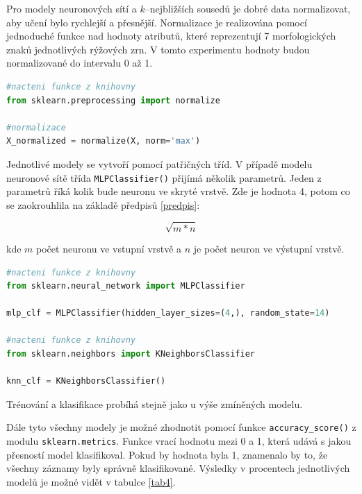Pro modely neuronových sítí a $k$--nejbližších sousedů je dobré data normalizovat, aby učení bylo rychlejší a přesnější. Normalizace je realizována pomocí jednoduché funkce nad hodnoty atributů, které reprezentují 7 morfologických znaků jednotlivých rýžových zrn. V tomto experimentu hodnoty budou normalizované do intervalu 0 až 1.

\begin{mdframed}
\begin{lstlisting}[language=Python]
#nacteni funkce z knihovny
from sklearn.preprocessing import normalize

#normalizace
X_normalized = normalize(X, norm='max')
\end{lstlisting}   
\end{mdframed}

Jednotlivé modely se vytvoří pomocí patřičných tříd. V případě modelu neuronové sítě
třída \verb|MLPClassifier()| přijímá několik parametrů. Jeden z parametrů říká kolik bude neuronu ve skryté vrstvě. Zde je hodnota 4, potom co se zaokrouhlila na základě předpisů \ref{predpis}:

\begin{equation}
    \sqrt{m*n}
    \label{predpis}
\end{equation}

kde $m$ počet neuronu ve vstupní vrstvě a $n$ je počet neuron ve výstupní vrstvě.

\begin{mdframed}
\begin{lstlisting}[language=Python]
#nacteni funkce z knihovny
from sklearn.neural_network import MLPClassifier

mlp_clf = MLPClassifier(hidden_layer_sizes=(4,), random_state=14)

#nacteni funkce z knihovny
from sklearn.neighbors import KNeighborsClassifier

knn_clf = KNeighborsClassifier()
\end{lstlisting}   
\end{mdframed}

Trénování a klasifikace probíhá stejně jako u výše zmíněných modelu. 

Dále tyto všechny modely je možné zhodnotit pomocí funkce \verb|accuracy_score()| z modulu \verb|sklearn.metrics|. Funkce vrací hodnotu mezi 0 a 1, která udává s jakou přesností model klasifikoval. Pokud by hodnota byla 1, znamenalo by to, že všechny záznamy byly správně klasifikované. Výsledky v procentech jednotlivých modelů je možné vidět v tabulce \ref{tab4}.

